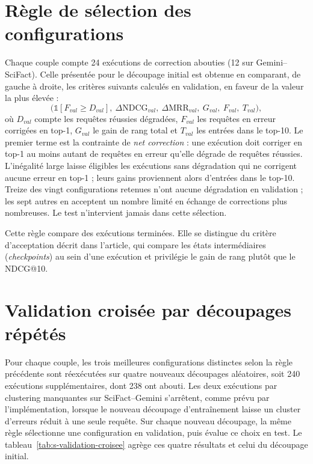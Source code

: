 \documentclass[a4paper,10pt]{article}
\begin{document}
\section{Règle de sélection des configurations}

Chaque couple compte 24 exécutions de correction abouties (12 sur Gemini--SciFact). Celle présentée pour le découpage initial est obtenue en comparant, de gauche à droite, les critères suivants calculés en validation, en faveur de la valeur la plus élevée :
\begin{equation*}
  \bigl(\mathbb{1}[F_{val}\geq D_{val}],\ \Delta\text{NDCG}_{val},\ \Delta\text{MRR}_{val},\ G_{val},\ F_{val},\ T_{val}\bigr),
\end{equation*}
où $D_{val}$ compte les requêtes réussies dégradées, $F_{val}$ les requêtes en erreur corrigées en top-1, $G_{val}$ le gain de rang total et $T_{val}$ les entrées dans le top-10. Le premier terme est la contrainte de \textit{net correction} : une exécution doit corriger en top-1 au moins autant de requêtes en erreur qu'elle dégrade de requêtes réussies. L'inégalité large laisse éligibles les exécutions sans dégradation qui ne corrigent aucune erreur en top-1 ; leurs gains proviennent alors d'entrées dans le top-10. Treize des vingt configurations retenues n'ont aucune dégradation en validation ; les sept autres en acceptent un nombre limité en échange de corrections plus nombreuses. Le test n'intervient jamais dans cette sélection.

Cette règle compare des exécutions terminées. Elle se distingue du critère d'acceptation décrit dans l'article, qui compare les états intermédiaires (\textit{checkpoints}) au sein d'une exécution et privilégie le gain de rang plutôt que le NDCG@10.

\section{Validation croisée par découpages répétés}

Pour chaque couple, les trois meilleures configurations distinctes selon la règle précédente sont réexécutées sur quatre nouveaux découpages aléatoires, soit 240 exécutions supplémentaires, dont 238 ont abouti. Les deux exécutions par clustering manquantes sur SciFact--Gemini s'arrêtent, comme prévu par l'implémentation, lorsque le nouveau découpage d'entraînement laisse un cluster d'erreurs réduit à une seule requête. Sur chaque nouveau découpage, la même règle sélectionne une configuration en validation, puis évalue ce choix en test. Le tableau~\ref{tab:s-validation-croisee} agrège ces quatre résultats et celui du découpage initial.
\end{document}
